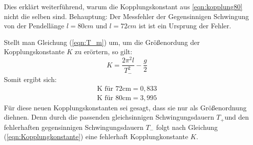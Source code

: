 Dies erklärt weiterführend, warum die Kopplungskonstant aus \ref{eqn:kopplung80} nicht die selben
sind.
Behauptung: Der Messfehler der Gegensinnigen Schwingung von der Pendellänge $l=80cm$ und $l=72cm$ ist 
ist ein Ursprung der Fehler.

Stellt man Gleichung (\ref{eqn:T_m}) um, um die Größenordung der Kopplungskonstante $K$ zu erörtern, so gilt:
\begin{equation}
    K=\frac{2\pi^2l}{T_{-}^2}-\frac{g}{2}
\end{equation}
Somit ergibt sich:
\begin{align*}
    \textrm{K für 72cm} = 0,833\\
    \textrm{K für 80cm} = 3,995 
\end{align*}
Für diese neuen Kopplungskonstanten sei gesagt, dass sie nur als Größenordnung diehnen.
Denn durch die passenden gleichsinnigen Schwingungsdauern $T_+$und den fehlerhaften gegensinnigen Schwingungsdauern $T_-$
folgt nach Gleichung (\ref{eqn:Kopplungkonstante}) eine fehlerhaft Kopplungkonstante $K$.
 
